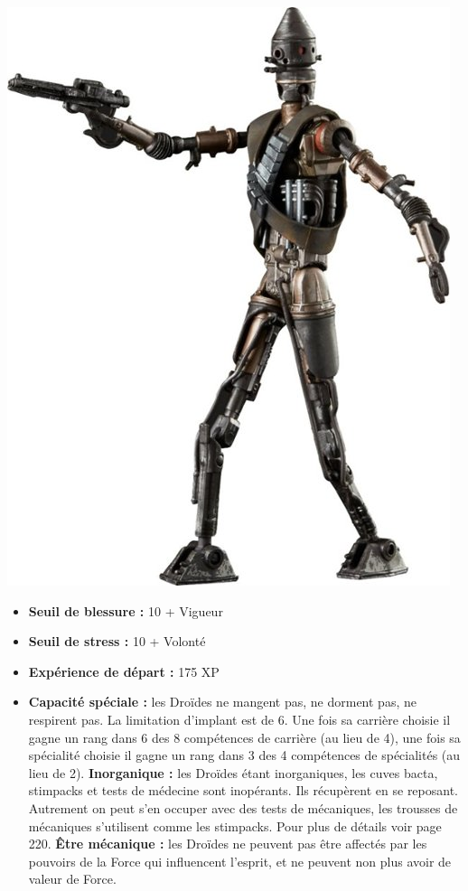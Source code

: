 \documentclass[twoside]{article}
\begin{document}
\noindent\begin{minipage}{0.3\textwidth}
	\includegraphics[width=1\linewidth]{../img/species/droid}
\end{minipage}%
\hfill%
\begin{minipage}{0.7\textwidth}\raggedleft
	\begin{itemize}
		\item \textbf{Seuil de blessure :} 10 + Vigueur 
		\item \textbf{Seuil de stress :} 10 + Volonté 
		\item \textbf{Expérience de départ :} 175 XP
		\item \textbf{Capacité spéciale :} les Droïdes ne mangent pas, ne dorment pas, ne respirent pas. La limitation d'implant est de 6. Une fois sa carrière choisie il gagne un rang dans 6 des 8 compétences de carrière (au lieu de 4), une fois sa spécialité choisie il gagne un rang dans 3 des 4 compétences de spécialités (au lieu de 2). \textbf{Inorganique :} les Droïdes étant inorganiques, les cuves bacta, stimpacks et tests de médecine sont inopérants. Ils récupèrent en se reposant. Autrement on peut s'en occuper avec des tests de mécaniques, les trousses de mécaniques s'utilisent comme les stimpacks. Pour plus de détails voir page 220. \textbf{Être mécanique : }les Droïdes ne peuvent pas être affectés par les pouvoirs de la Force qui influencent l'esprit, et ne peuvent non plus avoir de valeur de Force.
	\end{itemize}
\end{minipage}
\end{document}
